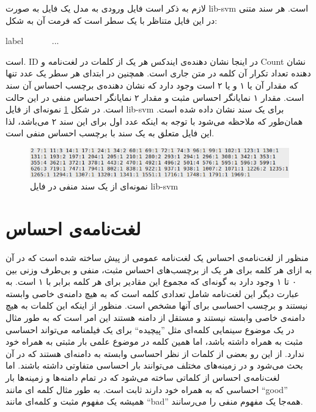 لازم به ذکر است فایل ورودی به مدل یک فایل به صورت 
lib-svm
است. هر سند متنی در این فایل متناظر با یک سطر است که فرمت آن به شکل:
\begin{latin}
	label \ <ID:Count> \ <ID:Count> \ <ID:Count> \ ... 
\end{latin} 
است.
ID
در اینجا نشان دهنده‌ی ایندکس هر یک از کلمات در لغت‌نامه و
Count
نشان دهنده تعداد تکرار آن کلمه در متن جاری است. همچنین در ابتدای هر سطر یک عدد تنها که مقدار آن یا ۱ و یا ۲ است وجود دارد که نشان دهند‌ه‌ی برچسب احساس آن سند است. مقدار ۱ نمایانگر احساس مثبت و مقدار ۲ نمایانگر احساس منفی‌ در این حالت است. در شکل 
\ref{chap5-fig1}
نمونه‌ای از فایل 
lib-svm
برای یک سند نشان داده شده است. همان‌طور که ملاحظه می‌شود با توجه به اینکه عدد اول برای این سند ۲ می‌باشد، لذا این فایل متعلق به یک سند با برچسب احساس منفی است.
\begin{figure}[!t]
	\centering
	\includegraphics[scale=0.7]{chap5-img/libsvm-example}
	\caption{نمونه‌ای از یک سند منفی در فایل lib-svm}
	\label{chap5-fig1}
\end{figure}


\section{لغت‌نامه‌ی احساس}
\label{chap5sec5}
منظور از لغت‌نامه‌ی احساس یک لغت‌نامه عمومی‌ از پیش ساخته شده است که در آن به ازای هر کلمه برای هر یک از برچسب‌های احساس مثبت، منفی‌ و بی‌طرف وزنی بین ۰ تا ۱ وجود دارد به گونه‌ای که مجموع این مقادیر برای هر کلمه برابر با ۱ است. به عبارت دیگر این لغت‌نامه شامل تعدادی کلمه است که به هیچ دامنه‌ی خاصی‌ وابسته نیستند و برچسب احساسی‌ برای آنها مشخص است. منظور از اینکه این کلمات به هیچ دامنه‌ی خاصی‌ وابسته نیستند و مستقل از دامنه هستند این امر است که به طور مثال در یک موضوع سینمایی کلمه‌ای مثل ''پیچیده`` برای یک فیلمنامه می‌‌تواند احساسی‌ مثبت به همراه داشته باشد، اما همین کلمه در موضوع علمی‌ بار مثبتی به همراه خود ندارد. از این رو بعضی‌ از کلمات از نظر احساسی‌ وابسته به دامنه‌ای هستند که در آن بحث می‌‌شود و در زمینه‌های مختلف می‌‌توانند بار احساسی‌ متفاوتی داشته باشند. اما لغت‌نامه‌ی احساس از کلماتی ساخته می‌‌شود که در تمام دامنه‌‌ها و زمینه‌ها بار احساسی‌ که به همراه خود دارند ثابت است. به طور مثال کلمه ای‌ مانند
``good''
همیشه یک مفهوم مثبت و کلمه‌ای مانند
``bad'' 
 همه‌‌جا یک مفهوم منفی‌ را می‌‌رسانند.

